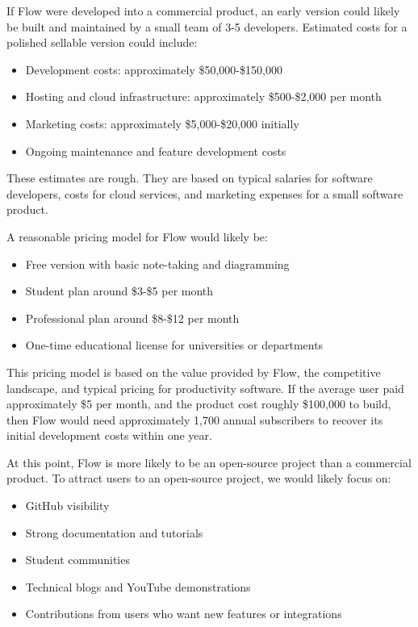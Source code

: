 \documentclass{article}
\begin{document}
If Flow were developed into a commercial product, an early version could likely 
be built and maintained by a small team of 3-5 developers. Estimated costs for a 
polished sellable version could include:
\begin{itemize}
\item Development costs: approximately \$50,000-\$150,000
\item Hosting and cloud infrastructure: approximately \$500-\$2,000 per month
\item Marketing costs: approximately \$5,000-\$20,000 initially
\item Ongoing maintenance and feature development costs
\end{itemize}

\vspace{0.5em}

These estimates are rough. They are based on typical salaries for software 
developers, costs for cloud services, and marketing expenses for a small software 
product.

\vspace{0.5em}

A reasonable pricing model for Flow would likely be:
\begin{itemize}
\item Free version with basic note-taking and diagramming
\item Student plan around \$3-\$5 per month
\item Professional plan around \$8-\$12 per month
\item One-time educational license for universities or departments
\end{itemize}
This pricing model is based on the value provided by Flow, the competitive 
landscape, and typical pricing for productivity software. If the average user 
paid approximately \$5 per month, and the product cost roughly \$100,000 to build, 
then Flow would need approximately 1,700 annual subscribers to recover its 
initial development costs within one year. 

At this point, Flow is more likely to be an open-source project than a commercial
product. To attract users to an open-source project, we would likely focus on:
\begin{itemize}
\item GitHub visibility
\item Strong documentation and tutorials
\item Student communities
\item Technical blogs and YouTube demonstrations
\item Contributions from users who want new features or integrations
\end{itemize}
\end{document}
